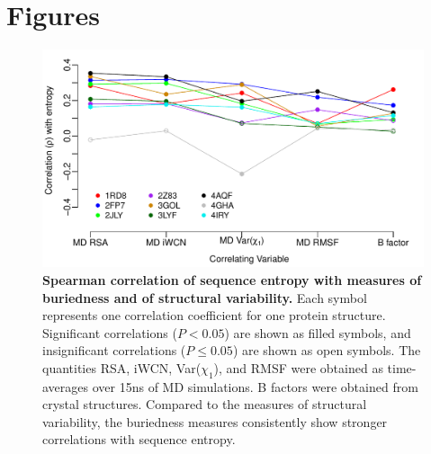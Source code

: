 \documentclass[12pt]{article}
\begin{document}
\cleardoublepage

\section*{Figures}


\begin{figure}[tbh]
\begin{center}
    \includegraphics[width=5in]{cor_entropy_all.pdf}
\end{center}
\caption{\textbf{Spearman correlation of sequence entropy with measures of buriedness and of structural variability.} Each symbol represents one correlation coefficient for one protein structure. Significant correlations ($P<0.05$) are shown as filled symbols, and insignificant correlations ($P\leq0.05$) are shown as open symbols. The quantities RSA, iWCN, Var($\chi_1$), and RMSF were obtained as time-averages over 15ns of MD simulations. B factors were obtained from crystal structures. Compared to the measures of structural variability, the buriedness measures consistently show stronger correlations with sequence entropy.}
\label{fig:cor_entropy_all}
\end{figure}
\end{document}
